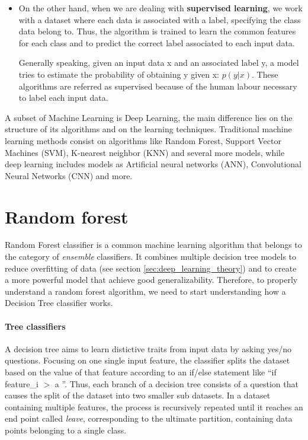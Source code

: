 \documentclass[11pt]{report}
\begin{document}
\begin{itemize}
\item On the other hand, when we are dealing with \textbf{supervised learning}, we work with a dataset where each data is associated with a label, specifying the class data belong to.
Thus, the algorithm is trained to learn the common features for each class and to predict the correct label associated to each input data.

Generally speaking, given an input data x and an associated label y, a model tries to estimate the probability of obtaining y given x: $p(y|x)$.
These algorithms are referred as supervised because of the human labour necessary to label each input data.
\end{itemize}

A subset of Machine Learning is Deep Learning, the main difference lies on the structure of its algorithms and on the learning techniques.
Traditional machine learning methods consist on algorithms like Random Forest, Support Vector Machines (SVM), K-nearest neighbor (KNN) and several more models, while deep learning includes models as Artificial neural networks (ANN), Convolutional Neural Networks (CNN) and more.


\section{Random forest}
Random Forest classifier is a common machine learning algorithm that belongs to the category of \emph{ensemble} classifiers.
It combines multiple decision tree models to reduce overfitting of data (see section \ref{sec:deep_learning_theory}) and to create a more powerful model that achieve good generalizability.
Therefore, to properly understand a random forest algorithm, we need to start understanding how a Decision Tree classifier works.

\paragraph{Tree classifiers} \hfill

\noindent A decision tree aims to learn distictive traits from input data by asking yes/no questions.
Focusing on one single input feature, the classifier splits the dataset based on the value of that feature according to an if/else statement like \textquotedblleft if feature\_i $>$ a \textquotedblright.
Thus, each branch of a decision tree consists of a question that causes the split of the dataset into two smaller sub datasets.
In a dataset containing multiple features, the process is recursively repeated until it reaches an end point called \emph{leave}, corresponding to the ultimate partition, containing data points belonging to a single class.
\end{document}
